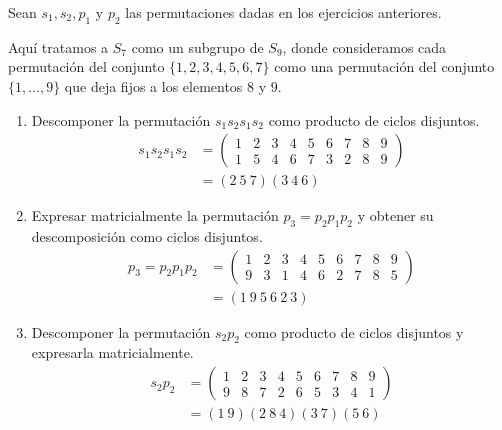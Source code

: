 \begin{ejercicio}\label{ej:2.16}
    Sean $s_1, s_2, p_1$ y $p_2$ las permutaciones dadas en los ejercicios anteriores.
    \begin{observacion}
        Aquí tratamos a $S_7$ como un subgrupo de $S_9$, donde consideramos cada permutación del conjunto $\{1, 2, 3, 4, 5, 6, 7\}$ como una permutación del conjunto $\{1, \ldots, 9\}$ que deja fijos a los elementos $8$ y $9$.
    \end{observacion}
    \begin{enumerate}
        \item Descomponer la permutación $s_1s_2s_1s_2$ como producto de ciclos disjuntos.
        \begin{align*}
            s_1s_2s_1s_2 &=
            \begin{pmatrix}
                1 & 2 & 3 & 4 & 5 & 6 & 7 & 8 & 9 \\
                1 & 5 & 4 & 6 & 7 & 3 & 2 & 8 & 9
            \end{pmatrix}\\
            &= (2\ 5\ 7)(3\ 4\ 6)
        \end{align*}

        \item Expresar matricialmente la permutación $p_3 = p_2p_1p_2$ y obtener su descomposición como ciclos disjuntos.
        \begin{align*}
            p_3 = p_2p_1p_2 &=
            \begin{pmatrix}
                1 & 2 & 3 & 4 & 5 & 6 & 7 & 8 & 9 \\
                9 & 3 & 1 & 4 & 6 & 2 & 7 & 8 & 5
            \end{pmatrix}\\
            &= (1\ 9\ 5\ 6\ 2\ 3)
        \end{align*}
        \item Descomponer la permutación $s_2p_2$ como producto de ciclos disjuntos y expresarla matricialmente.
        \begin{align*}
            s_2p_2 &=
            \begin{pmatrix}
                1 & 2 & 3 & 4 & 5 & 6 & 7 & 8 & 9 \\
                9 & 8 & 7 & 2 & 6 & 5 & 3 & 4 & 1
            \end{pmatrix}\\
            &= (1\ 9)(2\ 8\ 4)(3\ 7)(5\ 6)
        \end{align*}
    \end{enumerate}
\end{ejercicio}


